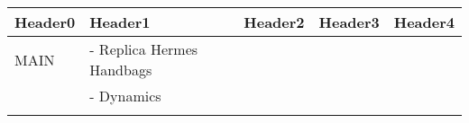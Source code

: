 \begin{longtable}[]{@{}lllll@{}}
\toprule
\begin{minipage}[b]{0.17\columnwidth}\raggedright
Header0\strut
\end{minipage} & \begin{minipage}[b]{0.17\columnwidth}\raggedright
Header1\strut
\end{minipage} & \begin{minipage}[b]{0.17\columnwidth}\raggedright
Header2\strut
\end{minipage} & \begin{minipage}[b]{0.17\columnwidth}\raggedright
Header3\strut
\end{minipage} & \begin{minipage}[b]{0.17\columnwidth}\raggedright
Header4\strut
\end{minipage}\tabularnewline
\midrule
\endhead
\begin{minipage}[t]{0.17\columnwidth}\raggedright
MAIN\strut
\end{minipage} & \begin{minipage}[t]{0.17\columnwidth}\raggedright
- Replica Hermes Handbags\strut
\end{minipage} & \begin{minipage}[t]{0.17\columnwidth}\raggedright
\strut
\end{minipage} & \begin{minipage}[t]{0.17\columnwidth}\raggedright
\strut
\end{minipage} & \begin{minipage}[t]{0.17\columnwidth}\raggedright
\strut
\end{minipage}\tabularnewline
\begin{minipage}[t]{0.17\columnwidth}\raggedright
\strut
\end{minipage} & \begin{minipage}[t]{0.17\columnwidth}\raggedright
- Dynamics\strut
\end{minipage} & \begin{minipage}[t]{0.17\columnwidth}\raggedright
\strut
\end{minipage} & \begin{minipage}[t]{0.17\columnwidth}\raggedright
\strut
\end{minipage} & \begin{minipage}[t]{0.17\columnwidth}\raggedright
\strut
\end{minipage}\tabularnewline
\begin{minipage}[t]{0.17\columnwidth}\raggedright

\end{minipage}
\end{longtable}
